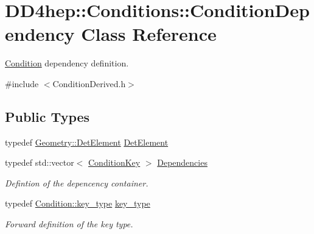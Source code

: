\hypertarget{class_d_d4hep_1_1_conditions_1_1_condition_dependency}{}\section{D\+D4hep\+:\+:Conditions\+:\+:Condition\+Dependency Class Reference}
\label{class_d_d4hep_1_1_conditions_1_1_condition_dependency}


\hyperlink{class_d_d4hep_1_1_conditions_1_1_condition}{Condition} dependency definition.  




{\ttfamily \#include $<$Condition\+Derived.\+h$>$}

\subsection*{Public Types}
\begin{DoxyCompactItemize}
\item 
typedef \hyperlink{class_d_d4hep_1_1_geometry_1_1_det_element}{Geometry\+::\+Det\+Element} \hyperlink{class_d_d4hep_1_1_conditions_1_1_condition_dependency_a0a9ea458cf85d1d76dec51d85830f738}{Det\+Element}
\item 
typedef std\+::vector$<$ \hyperlink{class_d_d4hep_1_1_conditions_1_1_condition_key}{Condition\+Key} $>$ \hyperlink{class_d_d4hep_1_1_conditions_1_1_condition_dependency_af1594501f40e514c5748092b94e4fd84}{Dependencies}
\begin{DoxyCompactList}\small\item\em Defintion of the depencency container. \end{DoxyCompactList}\item 
typedef \hyperlink{class_d_d4hep_1_1_conditions_1_1_condition_a7528efa762e8cc072ef80ea67c3531f9}{Condition\+::key\+\_\+type} \hyperlink{class_d_d4hep_1_1_conditions_1_1_condition_dependency_aeeb9606d1e1aae0a6eb4063ccfd1fca2}{key\+\_\+type}
\begin{DoxyCompactList}\small\item\em Forward definition of the key type. \end{DoxyCompactList}\end{DoxyCompactItemize}
